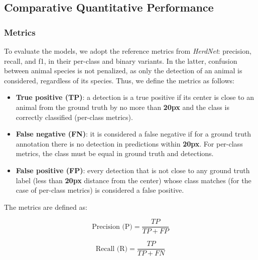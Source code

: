 \subsection{Comparative Quantitative Performance}

\subsubsection{Metrics}

To evaluate the models, we adopt the reference metrics from \textit{HerdNet}: precision, recall, and f1, in their per-class and binary variants. In the latter, confusion between animal species is not penalized, as only the detection of an animal is considered, regardless of its species. Thus, we define the metrics as follows:

\begin{itemize}
    \item \textbf{True positive (TP)}: a detection is a true positive if its center is close to an animal from the ground truth by no more than \textbf{20px} and the class is correctly classified (per-class metrics).

    \item \textbf{False negative (FN)}: it is considered a false negative if for a ground truth annotation there is no detection in predictions within \textbf{20px}. For per-class metrics, the class must be equal in ground truth and detections.

    \item \textbf{False positive (FP)}: every detection that is not close to any ground truth label (less than \textbf{20px} distance from the center) whose class matches (for the case of per-class metrics) is considered a false positive.
\end{itemize}

\noindent The metrics are defined as:

%
%
%
%

\[
\text{Precision (P)} = \frac{TP}{TP + FP}
\]

\[
\text{Recall (R)} = \frac{TP}{TP + FN}
\]

